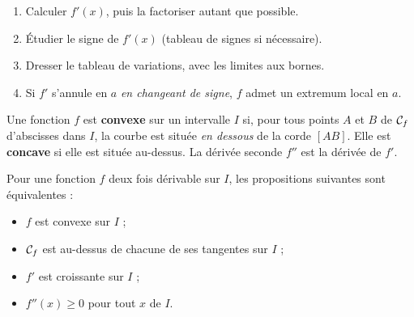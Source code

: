 \begin{savoirfaire}
\begin{enumerate}[label=\otLabel{\arabic*.},leftmargin=1.6em,itemsep=0.6mm,topsep=0.5mm]
  \item Calculer $f'(x)$, puis la factoriser autant que possible.
  \item Étudier le signe de $f'(x)$ (tableau de signes si nécessaire).
  \item Dresser le tableau de variations, avec les limites aux bornes.
  \item Si $f'$ s'annule en $a$ \emph{en changeant de signe}, $f$ admet un extremum local en $a$.
\end{enumerate}
\end{savoirfaire}


\begin{definition}
Une fonction $f$ est \textbf{convexe} sur un intervalle $I$ si, pour tous points $A$ et $B$ de $\mathcal{C}_f$ d'abscisses dans
$I$, la courbe est située \emph{en dessous} de la corde $[AB]$. Elle est \textbf{concave} si elle est située au-dessus.
La dérivée seconde $f''$ est la dérivée de $f'$.
\end{definition}

\begin{theoreme}
Pour une fonction $f$ deux fois dérivable sur $I$, les propositions suivantes sont équivalentes :
\begin{itemize}[label={\color{otNavy}\textbullet},leftmargin=1.4em,itemsep=0.4mm,topsep=0.8mm]
  \item $f$ est convexe sur $I$ ;
  \item $\mathcal{C}_f$ est au-dessus de chacune de ses tangentes sur $I$ ;
  \item $f'$ est croissante sur $I$ ;
  \item $f''(x)\geq0$ pour tout $x$ de $I$.
\end{itemize}
\end{theoreme}

